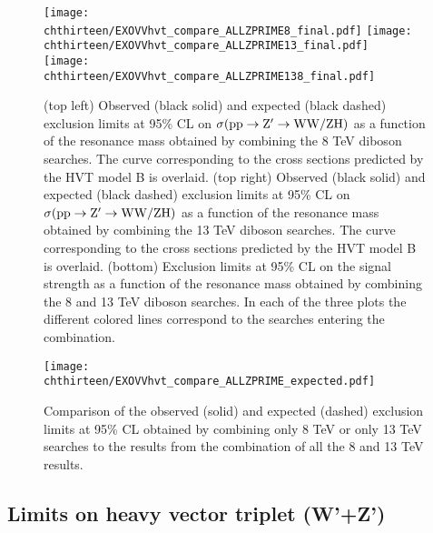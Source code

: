 \begin{figure}[htbp]
\centering
\texttt{[image: \\chthirteen/EXOVVhvt\_compare\_ALLZPRIME8\_final.pdf]}
\texttt{[image: \\chthirteen/EXOVVhvt\_compare\_ALLZPRIME13\_final.pdf]} \\
\texttt{[image: \\chthirteen/EXOVVhvt\_compare\_ALLZPRIME138\_final.pdf]}
\caption{%
(top left) Observed (black solid) and expected (black dashed) exclusion limits at 95\% CL on $\sigma( \rm pp \to \mathrm{Z}^\prime \to WW/ZH)$ as a function of the resonance mass obtained by combining the 8 TeV diboson searches. The curve corresponding to the cross sections predicted by the HVT model B is overlaid. (top right) Observed (black solid) and expected (black dashed) exclusion limits at 95\% CL on $\sigma( \rm pp \to \mathrm{Z}^\prime \to WW/ZH)$ as a function of the resonance mass obtained by combining the 13 TeV diboson searches. The curve corresponding to the cross sections predicted by the HVT model B is overlaid. (bottom) Exclusion limits at 95\% CL on the signal strength as a function of the resonance mass obtained by combining the 8 and 13 TeV diboson searches. In each of the three plots the different colored lines correspond to the searches entering the combination.
}
\label{fig:zpall_138TeV}
\end{figure}

\begin{figure}[htbp]
\centering
\texttt{[image: \\chthirteen/EXOVVhvt\_compare\_ALLZPRIME\_expected.pdf]}
\caption{%
Comparison of the observed (solid) and expected (dashed) exclusion limits at 95\% CL obtained by combining only 8 TeV or only 13 TeV searches to the results from the combination of all the 8 and 13 TeV results.}
\label{fig:zpall_compare}
\end{figure}

\subsection{Limits on heavy vector triplet (W'+Z')}

